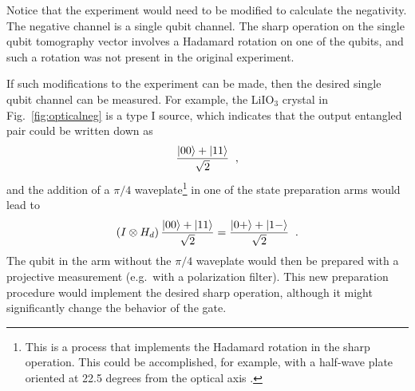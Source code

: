 Notice that the experiment would need to be modified to calculate the negativity.  The negative channel is a single qubit channel.  The sharp operation on the single qubit tomography vector involves a Hadamard rotation on one of the qubits, and such a rotation was not present in the original experiment. 

If such modifications to the experiment can be made, then the desired single qubit channel can be measured.  For example, the LiIO$_3$ crystal in Fig.\ \ref{fig:opticalneg} is a type I source, which indicates that the output entangled pair could be written down as \cite{Kok2010}
$$
\frac{\left|00\right\rangle+\left|11\right\rangle}{\sqrt{2}}\;\;,
$$  
and the addition of a $\pi/4$ waveplate\footnote{This is a process that implements the Hadamard rotation in the sharp operation.  This could be accomplished, for example, with a half-wave plate oriented at 22.5 degrees from the optical axis \cite{Ralph2010}.} in one of the state preparation arms would lead to
$$
\left(I\otimes H_d\right) \frac{\left|00\right\rangle+\left|11\right\rangle}{\sqrt{2}} = \frac{\left|0+\right\rangle+\left|1-\right\rangle}{\sqrt{2}}\;\;.
$$  
The qubit in the arm without the $\pi/4$ waveplate would then be prepared with a projective measurement (e.g.\ with a polarization filter).  This new preparation procedure would implement the desired sharp operation, although it might significantly change the behavior of the gate.

